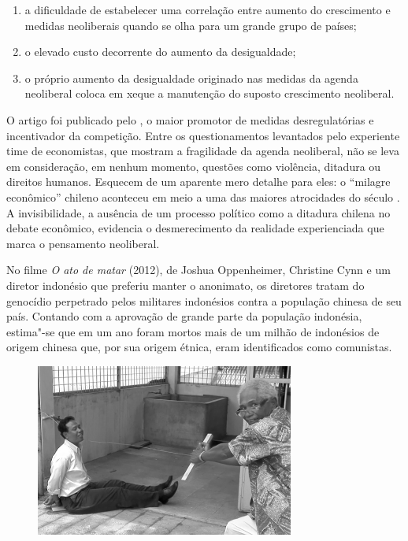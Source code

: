 \begin{enumerate}[label=\roman*.]
\item 
  a dificuldade de estabelecer uma correlação entre aumento do
  crescimento e medidas neoliberais quando se olha para um grande grupo
  de países;
\item 
  o elevado custo decorrente do aumento da desigualdade;
\item 
  o próprio aumento da desigualdade originado nas medidas da agenda
  neoliberal coloca em xeque a manutenção do suposto crescimento
  neoliberal.
\end{enumerate}

O artigo foi publicado pelo , o maior promotor de medidas
desregulatórias e incentivador da competição. Entre os questionamentos
levantados pelo experiente time de economistas, que mostram a
fragilidade da agenda neoliberal, não se leva em consideração, em nenhum
momento, questões como violência, ditadura ou direitos humanos.
Esquecem de um aparente mero detalhe para eles: o ``milagre econômico''
chileno aconteceu em meio a uma das maiores atrocidades do século . A
invisibilidade, a ausência de um processo político como a ditadura
chilena no debate econômico, evidencia o desmerecimento da realidade
experienciada que marca o pensamento neoliberal.

\asterisc

No filme \emph{O ato de matar} (2012), de Joshua Oppenheimer, Christine
Cynn e um diretor indonésio que preferiu manter o anonimato, os
diretores tratam do genocídio perpetrado pelos militares indonésios
contra a população chinesa de seu país. Contando com a aprovação de grande parte
da população indonésia, estima"-se que em um ano foram mortos mais de um milhão de
indonésios de origem chinesa que, por sua origem étnica, eram identificados como comunistas.

\begin{figure}[!ht]
\centering
 \includegraphics[width=85mm]{./imgs/frame1.png}
\caption{\tiny{}}
\end{figure}


